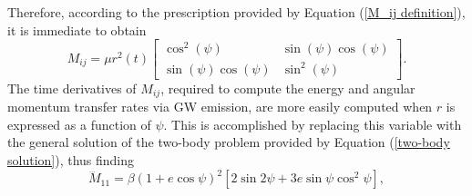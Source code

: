 \documentclass[12pt,twoside,openany]{book}
\begin{document}
Therefore, according to the prescription provided by Equation (\ref{M_ij definition}), it is immediate to obtain
\begin{equation}
M_{ij} = \mu r^2(t)\begin{bmatrix}
\cos^2(\psi) & \sin{(\psi)\cos(\psi)} \\
\sin{(\psi)\cos(\psi)} & \sin^2(\psi)
\end{bmatrix}.
\end{equation}
The time derivatives of $M_{ij}$, required to compute the energy and angular momentum transfer rates via GW emission, are more easily computed when $r$ is expressed as a function of $\psi$. This is accomplished by replacing this variable with the general solution of the two-body problem provided by Equation (\ref{two-body solution}), thus finding
\begin{equation}\label{d3M _11/dt3}  
\dddot{M}_{11} = \beta (1 + e \cos \psi)^2 \left[ 2 \sin 2\psi + 3e \sin \psi \cos^2 \psi \right],
\end{equation}
\end{document}
